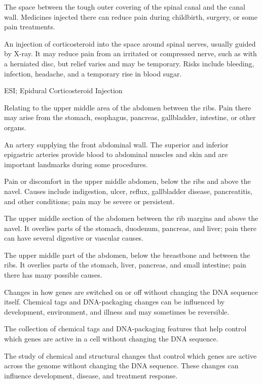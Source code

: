  The space between the tough outer covering of the spinal canal and the canal wall. Medicines injected there can reduce pain during childbirth, surgery, or some pain treatments.

 An injection of corticosteroid into the space around spinal nerves, usually guided by X-ray. It may reduce pain from an irritated or compressed nerve, such as with a herniated disc, but relief varies and may be temporary. Risks include bleeding, infection, headache, and a temporary rise in blood sugar.

\synonyms
ESI; Epidural Corticosteroid Injection

 Relating to the upper middle area of the abdomen between the ribs. Pain there may arise from the stomach, esophagus, pancreas, gallbladder, intestine, or other organs.

 An artery supplying the front abdominal wall. The superior and inferior epigastric arteries provide blood to abdominal muscles and skin and are important landmarks during some procedures.

 Pain or discomfort in the upper middle abdomen, below the ribs and above the navel. Causes include indigestion, ulcer, reflux, gallbladder disease, pancreatitis, and other conditions; pain may be severe or persistent.

 The upper middle section of the abdomen between the rib margins and above the navel. It overlies parts of the stomach, duodenum, pancreas, and liver; pain there can have several digestive or vascular causes.

 The upper middle part of the abdomen, below the breastbone and between the ribs. It overlies parts of the stomach, liver, pancreas, and small intestine; pain there has many possible causes.

 Changes in how genes are switched on or off without changing the DNA sequence itself. Chemical tags and DNA-packaging changes can be influenced by development, environment, and illness and may sometimes be reversible.

 The collection of chemical tags and DNA-packaging features that help control which genes are active in a cell without changing the DNA sequence.

 The study of chemical and structural changes that control which genes are active across the genome without changing the DNA sequence. These changes can influence development, disease, and treatment response.

